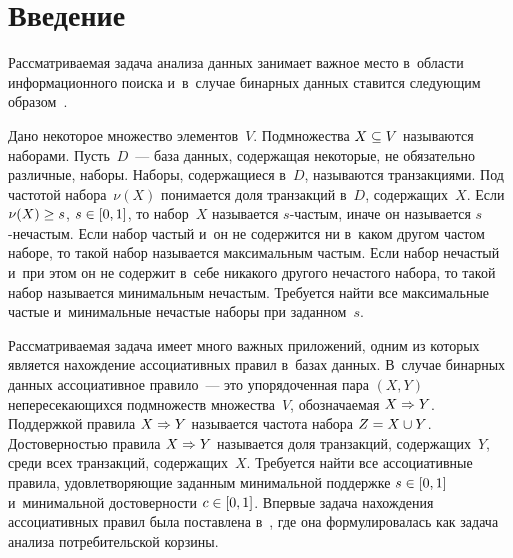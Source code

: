 
  



\thispagestyle{headings}

\begin{multicols}{2}

\label{st\stat}

    \section{Введение}
    
    Рас\-смат\-ри\-ва\-емая задача анализа данных занимает важ\-ное мес\-то в~об\-ласти 
    информационного поиска и~в~случае бинарных данных ставится сле\-ду\-ющим образом~\cite{4}.
    
    Дано некоторое множество элементов~$V$. Подмножества $X \hm\subseteq V$ называются наборами. Пусть~$D$~--- 
    база данных, содержащая некоторые, не обязательно различные, наборы. Наборы, 
    содержащиеся в~$D$, называются транз\-ак\-ци\-ями. Под частотой набора~$\nu(X)$ понимается доля транз\-ак\-ций в~$D$, 
    содержащих~$X$. Если $\nu(X) \hm\geq s$, $s \hm\in \left[0, 1\right]$, то набор~$X$ называется $s$-час\-тым, 
    иначе он называется $s$-не\-час\-тым. Если набор частый и~он не содержится ни в~каком другом 
    час\-том наборе, то такой набор называется максимальным час\-тым. Если набор не\-час\-тый 
    и~при этом он не содержит в~себе никакого другого не\-час\-то\-го набора, то такой набор 
    называется минимальным нечастым. Требуется найти все максимальные час\-тые и~минимальные не\-час\-тые 
    наборы при заданном~$s$.
    
    Рас\-смат\-ри\-ва\-емая задача имеет много важных приложений, одним из которых является 
    нахождение ассоциативных правил в~базах данных. В~случае бинарных данных ассоциативное правило~---
     это упорядоченная пара $ \left( X, Y \right)$ непересекающихся подмножеств множества~$V$, обо\-зна\-ча\-емая 
     $X \hm\Rightarrow Y$. Поддержкой правила $X \hm\Rightarrow Y$ называется час\-то\-та набора $Z\hm = X \cup Y$.
      Достоверностью правила $X\hm \Rightarrow Y$ называется доля транзакций, со\-дер\-жа\-щих~$Y$, 
      среди всех транзакций, содержащих~$X$. Требуется \mbox{найти} все ассоциативные правила, 
      удовле\-тво\-ря\-ющие заданным минимальной поддержке $s\hm \in [0, 1]$ и~минимальной 
      достоверности $c \hm\in [0, 1]$.  Впервые задача нахождения ассоциативных правил
       была поставлена в~\cite{1}, где она формулировалась как задача анализа по\-тре\-би\-тель\-ской корзины.


\end{multicols}
